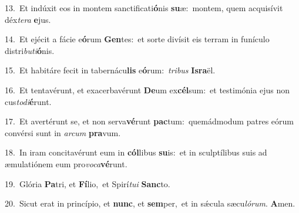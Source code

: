 {\numbfont\textcolor{\numbcolor}{13.}}~Et indúxit eos in montem sanctificati\-\textbf{ó}\-nis \textbf{su}\-æ:~\star montem, quem acquisívit déx\-\textit{te}\-\textit{ra} \textbf{e}\-jus.\par
{\numbfont\textcolor{\numbcolor}{14.}}~Et ejécit a fácie e\-\textbf{ó}\-rum \textbf{Gen}\-tes:~\star et sorte divísit eis terram in funículo distri\-\textit{bu}\-\textit{ti}\textbf{ó}nis.\par
{\numbfont\textcolor{\numbcolor}{15.}}~Et habitáre fecit in tabernácu\textbf{lis} e\-\textbf{ó}\-rum:~\star \textit{tri}\-\textit{bus} \textbf{Is}\-\textbf{ra}ël.\par
{\numbfont\textcolor{\numbcolor}{16.}}~Et tentavérunt, et exacerbavérunt \textbf{De}\-um ex\-\textbf{cél}\-sum:~\star et testimónia ejus non cus\-\textit{to}\-\textit{di}\textbf{é}runt.\par
{\numbfont\textcolor{\numbcolor}{17.}}~Et avertérunt se, et non serva\-\textbf{vé}\-runt \textbf{pac}\-tum:~\star quemádmodum patres eórum convérsi sunt in \textit{ar}\-\textit{cum} \textbf{pra}\-vum.\par
{\numbfont\textcolor{\numbcolor}{18.}}~In iram concitavérunt eum in \textbf{cól}\-libus \textbf{su}\-is:~\star et in sculptílibus suis ad æmulatiónem eum pro\-\textit{vo}\-\textit{ca}\textbf{vé}runt.\par
{\numbfont\textcolor{\numbcolor}{19.}}~Glória \textbf{Pa}\-tri, et \textbf{Fí}\-lio,~\star et Spirí\-\textit{tu}\-\textit{i} \textbf{Sanc}\-to.\par
{\numbfont\textcolor{\numbcolor}{20.}}~Sicut erat in princípio, et \textbf{nunc}\-, et \textbf{sem}\-per,~\star et in sǽcula sæcu\-\textit{ló}\-\textit{rum}. \textbf{A}\-men.\par
